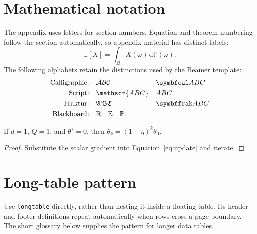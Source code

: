 \expandafter\documentclass\expandafter[\documentclassoptions]{article}
\begin{document}
\printbibliography[heading=bibintoc,title={References}]

\clearpage
\appendix
\section{Mathematical notation}\label{app:notation}

The appendix uses letters for section numbers. Equation and theorem numbering
follow the section automatically, so appendix material has distinct labels:
\begin{equation}\label{eq:appendix}
  \mathbb{E}[X]=\int_{\Omega}X(\omega)\,\mathrm{d}\mathbb{P}(\omega).
\end{equation}
The following alphabets retain the distinctions used by the Beamer template:
\begin{align*}
  \text{Calligraphic:}\quad & \mathcal{ABC} && \mathbcal{ABC} \\
  \text{Script:}\quad       & \mathscr{ABC} && \mathbscr{ABC} \\
  \text{Fraktur:}\quad      & \mathfrak{ABC} && \mathbfrak{ABC} \\
  \text{Blackboard:}\quad   & \mathbb{R}\quad\mathbb{E}\quad\mathbb{P}.
\end{align*}

\begin{lemma}
If $d=1$, $Q=1$, and $\theta^{\star}=0$, then
$\theta_k=(1-\eta)^k\theta_0$.
\end{lemma}
\begin{proof}
Substitute the scalar gradient into Equation~\eqref{eq:update} and iterate.
\end{proof}

\section{Long-table pattern}

Use \texttt{longtable} directly, rather than nesting it inside a floating table.
Its header and footer definitions repeat automatically when rows cross a page
boundary. The short glossary below supplies the pattern for longer data tables.
\end{document}
